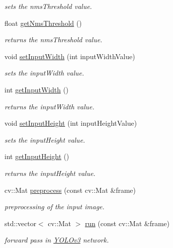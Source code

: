 \begin{DoxyCompactItemize}
\begin{DoxyCompactList}\small\item\em sets the nms\+Threshold value. \end{DoxyCompactList}\item 
float \hyperlink{classYOLOv3_a0ce3f0b428061d48ed5d00b85ea56f3d}{get\+Nms\+Threshold} ()
\begin{DoxyCompactList}\small\item\em returns the nms\+Threshold value. \end{DoxyCompactList}\item 
void \hyperlink{classYOLOv3_a56194e004250946f94d78c4305a199ce}{set\+Input\+Width} (int input\+Width\+Value)
\begin{DoxyCompactList}\small\item\em sets the input\+Width value. \end{DoxyCompactList}\item 
int \hyperlink{classYOLOv3_aaa7ca5307930fe1423d68ad684d44539}{get\+Input\+Width} ()
\begin{DoxyCompactList}\small\item\em returns the input\+Width value. \end{DoxyCompactList}\item 
void \hyperlink{classYOLOv3_a483646bca9b48589123916bc4727e3b5}{set\+Input\+Height} (int input\+Height\+Value)
\begin{DoxyCompactList}\small\item\em sets the input\+Height value. \end{DoxyCompactList}\item 
int \hyperlink{classYOLOv3_a03485f1f4664f4ab1ea8f524c6075806}{get\+Input\+Height} ()
\begin{DoxyCompactList}\small\item\em returns the input\+Height value. \end{DoxyCompactList}\item 
cv\+::\+Mat \hyperlink{classYOLOv3_a0baf53526f6ddedd524cf87e6518bb3b}{preprocess} (const cv\+::\+Mat \&frame)
\begin{DoxyCompactList}\small\item\em preprocessing of the input image. \end{DoxyCompactList}\item 
std\+::vector$<$ cv\+::\+Mat $>$ \hyperlink{classYOLOv3_ae62f2a8bc6f9ddf55acdc65e64425cd8}{run} (const cv\+::\+Mat \&frame)
\begin{DoxyCompactList}\small\item\em forward pass in \hyperlink{classYOLOv3}{Y\+O\+L\+Ov3} network. \end{DoxyCompactList}\item 

\end{DoxyCompactItemize}
